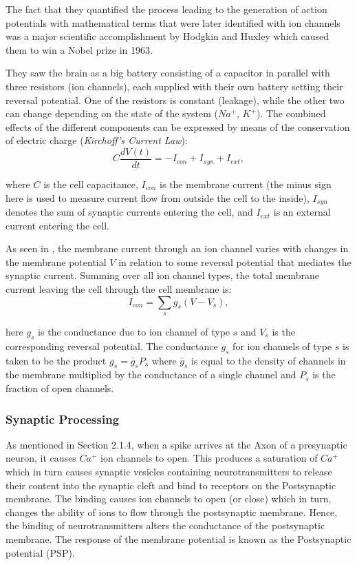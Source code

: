 \documentclass{uonmathreport}
\begin{document}
The fact that they quantified the process leading to the generation of action potentials with mathematical terms that were later identified with ion channels was a major scientific accomplishment by Hodgkin and Huxley which caused them to win a Nobel prize in 1963.

They saw the brain as a big battery consisting of a capacitor in parallel with three resistors (ion channels), each supplied with their own battery setting their reversal potential. One of the resistors is constant (leakage), while the other two can change depending on the state of the system ($Na^+$, $K^+$). The combined effects of the different components can be expressed by means of the conservation of electric charge (\textit{Kirchoff's Current Law}):
\begin{equation}
C \frac{dV(t)}{dt} = - I_{con} + I_{syn} + I_{ext},
\end{equation}

where $C$ is the cell capacitance, $I_{con}$ is the membrane current (the minus sign here is used to measure current flow from outside the cell to the inside), $I_{syn}$ denotes the sum of synaptic currents entering the cell, and $I_{ext}$ is an external current entering the cell.

As seen in \cite{bressloff2011spatiotemporal}, the membrane current through an ion channel varies  with changes in the membrane potential $V$ in relation to some reversal potential that mediates the synaptic current. Summing over all ion channel types, the total membrane current leaving the cell through the cell membrane is:
\begin{equation}
I_{con} = \sum_s g_s(V - V_s),
\end{equation}

here $g_s$ is the conductance due to ion channel of type $s$ and $V_s$ is the corresponding reversal potential. The conductance $g_s$ for ion channels of type $s$ is taken to be the product $g_s= \bar{g}_sP_s$ where $\bar{g}_s$ is equal to the density of channels in the membrane multiplied by the conductance of a single channel and $P_s$ is the fraction of open channels.

\subsubsection{Synaptic Processing}\label{subsubsec:syn_process}

As mentioned in Section 2.1.4, when a spike arrives at the Axon of a presynaptic neuron, it causes $Ca^+$ ion channels to open. This produces a saturation of $Ca^+$ which in turn causes synaptic vesicles containing neurotransmitters to release their content into the synaptic cleft and bind to receptors on the Postsynaptic membrane. The binding causes ion channels to open (or close) which in turn, changes the ability of ions to flow through the postsynaptic membrane. Hence, the binding of neurotransmitters alters the conductance of the postsynaptic membrane. The response of the membrane potential is known as the Postsynaptic potential (PSP).
\end{document}
